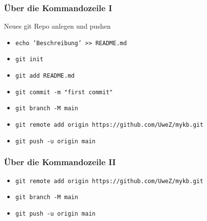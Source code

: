 \documentclass[12pt,ngerman]{beamer}
\begin{document}
\begin{frame}
\frametitle{Über die Kommandozeile I}

Neues git Repo anlegen und pushen

\begin{itemize}
	\item \texttt{echo 'Beschreibung'  >> README.md}
	\item \texttt{git init}
	\item  \texttt{git add README.md}
	\item  \texttt{git commit -m "first commit"}
	\item  \texttt{git branch -M main}
	\item  \texttt{git remote add origin https://github.com/UweZ/mykb.git}
	\item \texttt{git push -u origin main}
	\end{itemize}

\end{frame}

\begin{frame}
\frametitle{Über die Kommandozeile II}


\begin{itemize}
\item \texttt{git remote add origin https://github.com/UweZ/mykb.git}
\item \texttt{git branch -M main}
\item \texttt{git push -u origin main}
\end{itemize}


\end{frame}
\end{document}
